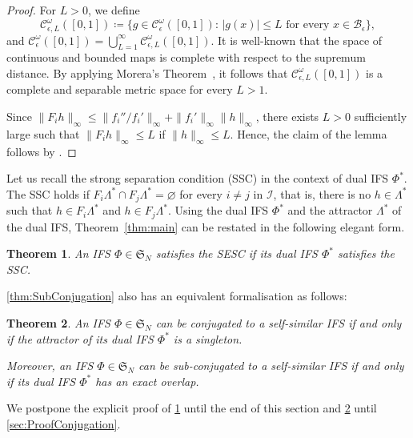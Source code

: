 \documentclass[11pt,]{article}
\def\cref#1{\ref{#1}}%
\newtheorem{theorem}{Theorem}[section]
\theoremstyle{definition}
\theoremstyle{remark}
\newcommand{\0}{\mathbf{0}}
\begin{document}
\begin{proof}
For $L>0$, we define 
$$
\mathcal{C}_{\epsilon,L}^{\omega}([0,1])\coloneqq \big\{g\in\mathcal{C}_\epsilon^{\omega}([0,1]):\, |g(x)|\leq L\text{ for every }x\in\mathcal{B}_\epsilon\big\},
$$
and $\mathcal{C}_{\epsilon}^{\omega}([0,1])=\bigcup_{L=1}^\infty\mathcal{C}_{\epsilon,L}^{\omega}([0,1])$. It is well-known that the space of continuous and bounded maps is complete with respect to the supremum distance. By applying Morera's Theorem~\cite[Theorem 10.17]{Rudin_AnalysisBook}, it follows that $\mathcal{C}_{\epsilon,L}^{\omega}([0,1])$ is a complete and separable metric space for every $L>1$.	
	
Since $\|F_ih\|_\infty\leq\|f_i'' / f_i'\|_\infty+\|f_i'\|_\infty\|h\|_\infty$, there exists $L>0$ sufficiently large such that $\|F_ih\|_\infty\leq L$ if $\|h\|_\infty\leq L$. Hence, the claim of the lemma follows by \cite{Hutchinson_Attractor_81}.
\end{proof}
Let us recall the strong separation condition (SSC) in the context of dual IFS $\Phi^*$. The SSC
holds if $F_i\Lambda^*\cap F_j\Lambda^*=\varnothing$ for every $i\neq j$ in $\mathcal{I}$, that is,
there is no $h\in\Lambda^*$ such that $h\in F_i\Lambda^*$ and $h\in F_j\Lambda^*$.
Using the dual IFS $\Phi^*$ and the attractor $\Lambda^*$ of the dual IFS, Theorem~\ref{thm:main} can be restated in the following elegant form.
\begin{theorem}\label{thm:DualSSC}
	An IFS $\Phi\in\mathfrak{S}_N$ satisfies the SESC if its dual IFS $\Phi^*$ satisfies the SSC.
\end{theorem}

\cref{thm:SubConjugation} also has an equivalent formalisation as follows:

\begin{theorem}\label{thm:DualConj}
	An IFS $\Phi\in\mathfrak{S}_N$ can be conjugated to a self-similar IFS if and only if the attractor of its dual IFS $\Phi^*$ is a singleton. 
	
	Moreover, an IFS $\Phi\in\mathfrak{S}_N$ can be sub-conjugated to a self-similar IFS if and only if its dual IFS $\Phi^*$ has an exact overlap.
\end{theorem}

We postpone the explicit proof of \cref{thm:DualSSC} until the end of this section and
\cref{thm:DualConj} until \cref{sec:ProofConjugation}.
\end{document}
